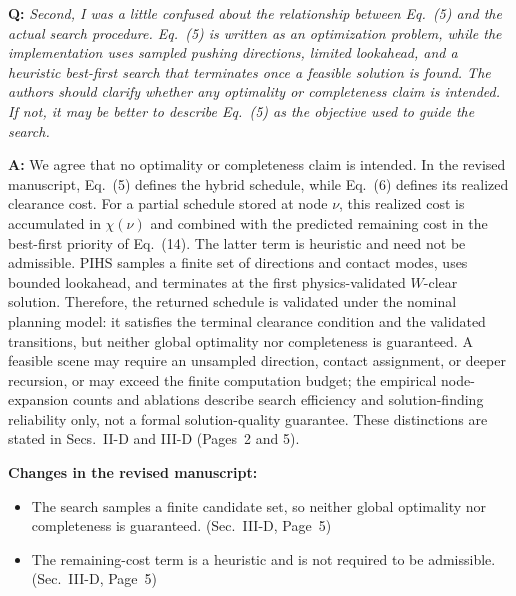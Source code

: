 \documentclass[11pt]{article}
\newcommand{\change}[1]{{\color{blue}#1}}
\begin{document}
\begin{shaded*}
\noindent \textbf{Q:}
{\itshape
Second, I was a little confused about the relationship between Eq.~(5)
and the actual search procedure. Eq.~(5) is written as an optimization
problem, while the implementation uses sampled pushing directions,
limited lookahead, and a heuristic best-first search that terminates
once a feasible solution is found. The authors should clarify whether
any optimality or completeness claim is intended. If not, it may be
better to describe Eq.~(5) as the objective used to guide the search.
}
\end{shaded*}

\noindent \textbf{A:}
We agree that no optimality or completeness claim is intended. In the revised
manuscript, Eq.~(5) defines the hybrid schedule, while Eq.~(6) defines its
realized clearance cost. For a partial schedule stored at node $\nu$, this
realized cost is accumulated in $\chi(\nu)$ and combined with the predicted
remaining cost in the best-first priority of Eq.~(14). The latter term is
heuristic and need not be admissible. PIHS samples a
finite set of directions and contact modes, uses bounded lookahead, and terminates at the first
physics-validated $W$-clear solution. Therefore, the returned schedule is validated
under the nominal planning model: it satisfies the terminal clearance condition and the validated
transitions, but neither global optimality nor completeness is guaranteed. A feasible scene may
require an unsampled direction, contact assignment, or deeper recursion, or may exceed the finite
computation budget; the empirical node-expansion counts and ablations describe search efficiency
and solution-finding reliability only, not a formal solution-quality guarantee. These distinctions are stated in Secs.~II-D and III-D (Pages~2 and 5).


\noindent\textbf{Changes in the revised manuscript:}

\begin{itemize}
\item \change{The search samples a finite candidate set, so neither global optimality nor
completeness is guaranteed.} (Sec.~III-D, Page~5)
\item \change{The remaining-cost term is a heuristic and is not required to be admissible.}
(Sec.~III-D, Page~5)
\end{itemize}
\end{document}
